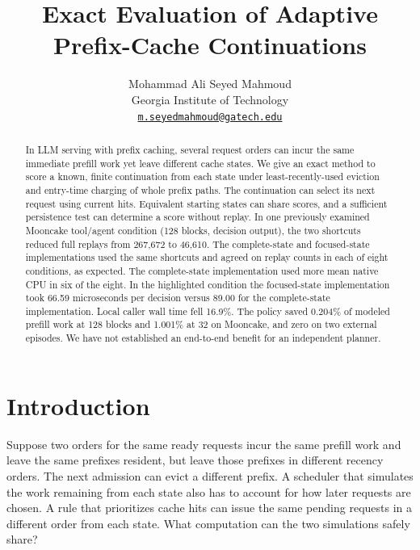 \documentclass[11pt,letterpaper]{article}
\title{Exact Evaluation of Adaptive Prefix-Cache Continuations}
\author{Mohammad Ali Seyed Mahmoud\\[3pt] {\normalsize Georgia Institute of Technology}\\[-1pt] {\small\href{mailto:m.seyedmahmoud@gatech.edu}{\nolinkurl{m.seyedmahmoud@gatech.edu}}}}
\date{}
\begin{document}
\maketitle


\begin{abstract}
In LLM serving with prefix caching, several request orders can incur the same immediate prefill work yet leave different cache states. We give an exact method to score a known, finite continuation from each state under least-recently-used eviction and entry-time charging of whole prefix paths. The continuation can select its next request using current hits. Equivalent starting states can share scores, and a sufficient persistence test can determine a score without replay. In one previously examined Mooncake tool/agent condition (128 blocks, decision output), the two shortcuts reduced full replays from 267,672 to 46,610. The complete-state and focused-state implementations used the same shortcuts and agreed on replay counts in each of eight conditions, as expected. The complete-state implementation used more mean native CPU in six of the eight. In the highlighted condition the focused-state implementation took 66.59 microseconds per decision versus 89.00 for the complete-state implementation. Local caller wall time fell 16.9\%. The policy saved 0.204\% of modeled prefill work at 128 blocks and 1.001\% at 32 on Mooncake, and zero on two external episodes. We have not established an end-to-end benefit for an independent planner.

\end{abstract}

\section{Introduction}

Suppose two orders for the same ready requests incur the same prefill work and leave the same prefixes resident, but leave those prefixes in different recency orders. The next admission can evict a different prefix. A scheduler that simulates the work remaining from each state also has to account for how later requests are chosen. A rule that prioritizes cache hits can issue the same pending requests in a different order from each state. What computation can the two simulations safely share?
\end{document}
